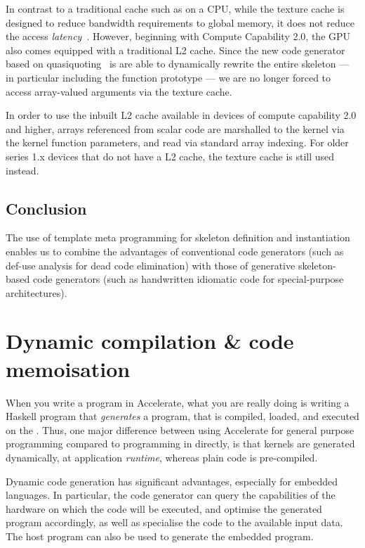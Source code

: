In contrast to a traditional cache such as on a CPU, while the texture cache is
designed to reduce bandwidth requirements to global memory, it does not reduce
the access \emph{latency}~\cite[\S5.3.2]{NVIDIA:2012wf}. However, beginning with
Compute Capability 2.0, the GPU also comes equipped with a traditional L2 cache.
Since the new code generator based on quasiquoting~\cite{CliftonEverest:2014vi}
is are able to dynamically rewrite the entire skeleton --- in particular
including the function prototype --- we are no longer forced to access
array-valued arguments via the texture cache.

In order to use the inbuilt L2 cache available in devices of compute capability
2.0 and higher, arrays referenced from scalar code are marshalled to the kernel
via the kernel function parameters, and read via standard array indexing. For
older series 1.x devices that do not have a L2 cache, the texture cache is still
used instead.


\subsection{Conclusion}

The use of template meta programming for skeleton definition and instantiation
enables us to combine the advantages of conventional code generators (such as
def-use analysis for dead code elimination) with those of generative
skeleton-based code generators (such as handwritten idiomatic code for
special-purpose architectures).


\section{Dynamic compilation \& code memoisation}
\label{sec:dynamic_compilation}

When you write a program in Accelerate, what you are really doing is writing a
Haskell program that \emph{generates} a \CUDA program, that is compiled,
loaded, and executed on the \GPU\@. Thus, one major difference between using
Accelerate for general purpose \GPU programming compared to programming in
\CUDA directly, is that kernels are generated dynamically, at application
\emph{runtime}, whereas plain \CUDA code is pre-compiled.

Dynamic code generation has significant advantages, especially for embedded
languages. In particular, the code generator can query the capabilities of the
hardware on which the code will be executed, and optimise the generated program
accordingly, as well as specialise the code to the available input data. The
host program can also be used to generate the embedded program.

